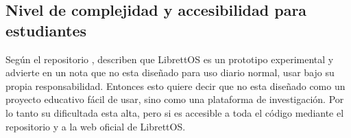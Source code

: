 \subsection{Nivel de complejidad y accesibilidad para estudiantes}
Según el repositorio \citep{repositorio_rumprun_github}, describen que LibrettOS es un prototipo experimental y advierte en un nota que no esta diseñado para uso diario normal, usar bajo su propia responsabilidad. Entonces esto quiere decir que no esta diseñado como un proyecto educativo fácil de usar, sino como una plataforma de investigación.
Por lo tanto su dificultada esta alta, pero si es accesible a toda el código mediante el repositorio y a la web oficial de LibrettOS.
